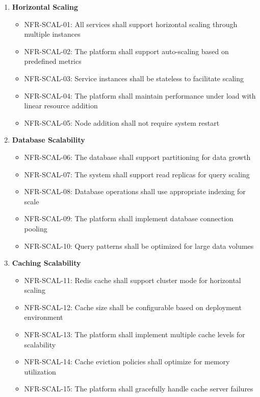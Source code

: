 \begin{enumerate}
   \item \textbf{Horizontal Scaling}
   \begin{itemize}
      \item NFR-SCAL-01: All services shall support horizontal scaling through multiple instances
      \item NFR-SCAL-02: The platform shall support auto-scaling based on predefined metrics
      \item NFR-SCAL-03: Service instances shall be stateless to facilitate scaling
      \item NFR-SCAL-04: The platform shall maintain performance under load with linear resource addition
      \item NFR-SCAL-05: Node addition shall not require system restart
   \end{itemize}

   \item \textbf{Database Scalability}
   \begin{itemize}
      \item NFR-SCAL-06: The database shall support partitioning for data growth
      \item NFR-SCAL-07: The system shall support read replicas for query scaling
      \item NFR-SCAL-08: Database operations shall use appropriate indexing for scale
      \item NFR-SCAL-09: The platform shall implement database connection pooling
      \item NFR-SCAL-10: Query patterns shall be optimized for large data volumes
   \end{itemize}

   \item \textbf{Caching Scalability}
   \begin{itemize}
      \item NFR-SCAL-11: Redis cache shall support cluster mode for horizontal scaling
      \item NFR-SCAL-12: Cache size shall be configurable based on deployment environment
      \item NFR-SCAL-13: The platform shall implement multiple cache levels for scalability
      \item NFR-SCAL-14: Cache eviction policies shall optimize for memory utilization
      \item NFR-SCAL-15: The platform shall gracefully handle cache server failures
   \end{itemize}


\end{enumerate}

